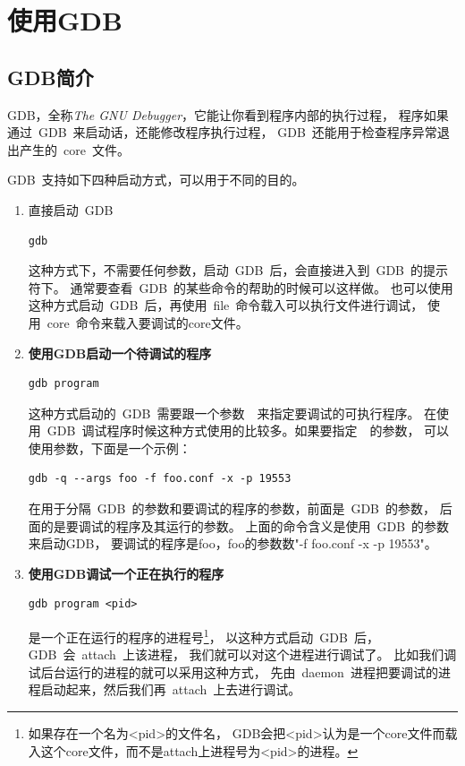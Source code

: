 
\chapter{使用GDB}
\label{ch_gdb} 

\section{GDB简介}

GDB，全称\emph{The GNU Debugger}，它能让你看到程序内部的执行过程，
程序如果通过~GDB~来启动话，还能修改程序执行过程，
GDB~还能用于检查程序异常退出产生的~core~文件。

GDB~支持如下四种启动方式，可以用于不同的目的。

\begin{enumerate}
\item 直接启动~GDB
\begin{lstlisting}
gdb
\end{lstlisting}
这种方式下，不需要任何参数，启动~GDB~后，会直接进入到~GDB~的提示符下。
通常要查看~GDB~的某些命令的帮助的时候可以这样做。
也可以使用这种方式启动~GDB~后，再使用~file~命令载入可以执行文件进行调试，
使用~core~命令来载入要调试的core文件。

\item \textbf{使用GDB启动一个待调试的程序}
\begin{lstlisting}
gdb program
\end{lstlisting}
这种方式启动的~GDB~需要跟一个参数~~来指定要调试的可执行程序。
在使用~GDB~调试程序时候这种方式使用的比较多。如果要指定~~的参数，
可以使用\label{sec:gdb_args}参数，下面是一个示例：
\begin{lstlisting}
gdb -q --args foo -f foo.conf -x -p 19553
\end{lstlisting}
在用于分隔~GDB~的参数和要调试的程序的参数，前面是~GDB~的参数，
后面的是要调试的程序及其运行的参数。
上面的命令含义是使用~GDB~的参数来启动GDB，
要调试的程序是foo，foo的参数数"-f foo.conf -x -p 19553"。

\item \textbf{使用GDB调试一个正在执行的程序} \label{sec:gdb_start_attach}
\begin{lstlisting}
gdb program <pid>
\end{lstlisting}
是一个正在运行的程序的进程号\footnote{如果存在一个名为<pid>的文件名，
GDB会把<pid>认为是一个core文件而载入这个core文件，而不是attach上进程号为<pid>的进程。}，
以这种方式启动~GDB~后，GDB~会~attach~上该进程，
我们就可以对这个进程进行调试了。
比如我们调试后台运行的进程的就可以采用这种方式，
先由~daemon~进程把要调试的进程启动起来，然后我们再~attach~上去进行调试。


\end{enumerate}
